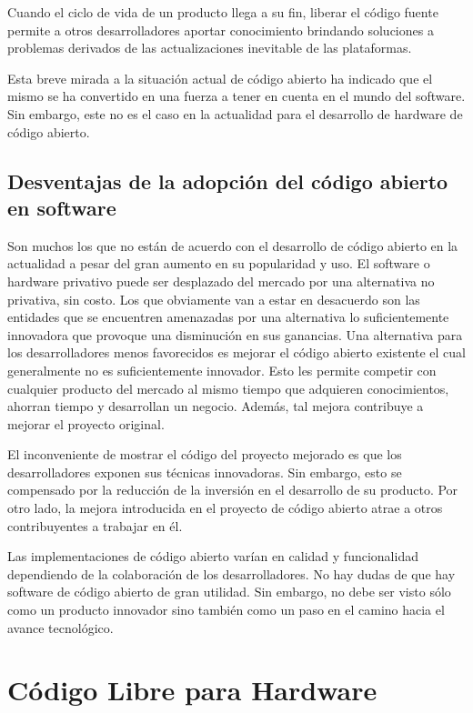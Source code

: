 Cuando el ciclo de vida de un producto llega a su fin, liberar el
código fuente permite a otros desarrolladores aportar conocimiento
brindando soluciones a problemas derivados de las actualizaciones
inevitable de las plataformas.

Esta breve mirada a la situación actual de código abierto ha indicado
que el mismo se ha convertido en una fuerza a tener en cuenta en el
mundo del software. Sin embargo, este no es el caso en la actualidad
para el desarrollo de hardware de código abierto.

\subsection{Desventajas de la adopción del código abierto en software}

Son muchos los que no están de acuerdo con el desarrollo de código
abierto en la actualidad a pesar del gran aumento en su popularidad y
uso. El software o hardware privativo puede ser desplazado del mercado
por una alternativa no privativa, sin costo. Los que obviamente van a
estar en desacuerdo son las entidades que se encuentren amenazadas por
una alternativa lo suficientemente innovadora que provoque una
disminución en sus ganancias. Una alternativa para los desarrolladores
menos favorecidos es mejorar el código abierto existente el cual
generalmente no es suficientemente innovador. Esto les permite
competir con cualquier producto del mercado al mismo tiempo que
adquieren conocimientos, ahorran tiempo y desarrollan un
negocio. Además, tal mejora contribuye a mejorar el proyecto original.

El inconveniente de mostrar el código del proyecto mejorado es que los
desarrolladores exponen sus técnicas innovadoras. Sin embargo, esto se
compensado por la reducción de la inversión en el desarrollo de su
producto. Por otro lado, la mejora introducida en el proyecto de
código abierto atrae a otros contribuyentes a trabajar en él.

Las implementaciones de código abierto varían en calidad y
funcionalidad dependiendo de la colaboración de los
desarrolladores. No hay dudas de que hay software de código abierto de
gran utilidad. Sin embargo, no debe ser visto sólo como un producto
innovador sino también como un paso en el camino hacia el avance
tecnológico.

\section{Código Libre para Hardware}

